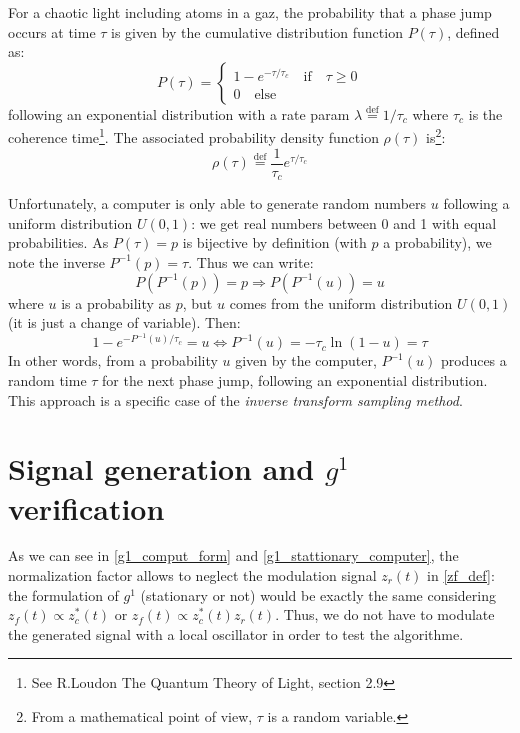 \documentclass[11pt]{report}
\begin{document}
For a chaotic light including atoms in a gaz, the probability that a phase jump occurs at time $\tau$ is given by the cumulative distribution function $P(\tau)$, defined as:
\begin{equation}
P(\tau) = \left\{
                \begin{array}{ll}
                1-e^{-\tau/\tau_c} \quad \textrm{if} \quad \tau \geqslant 0\\
                0 \quad \textrm{else}
                \end{array}
              \right.
\end{equation}
following an exponential distribution with a rate param $\lambda \stackrel{\text{def}}{=} 1 / \tau_c$ where $\tau_c$ is the coherence time\footnote{ See R.Loudon The Quantum Theory of Light, section 2.9}. The associated probability density function $\rho(\tau)$ is\footnote{From a mathematical point of view, $\tau$ is a random variable.}:
\begin{equation}
\rho(\tau) \stackrel{\text{def}}{=} \frac{1}{\tau_c} e^{\tau / \tau_c}
\end{equation}

Unfortunately, a computer is only able to generate random numbers $u$ following a uniform distribution $U(0,1)$: we get real numbers between 0 and 1 with equal probabilities. As $P(\tau) = p$ is bijective by definition (with $p$ a probability), we note the inverse $P^{-1}(p) = \tau$. Thus we can write:
\begin{equation}
P(P^{-1}(p)) = p \Rightarrow P(P^{-1}(u)) = u
\end{equation}
where $u$ is a probability as $p$, but $u$ comes from the uniform distribution $U(0,1)$ (it is just a change of variable). Then:
\begin{equation}
\label{dist_exp_gene}
1-e^{-P^{-1}(u)/\tau_c} = u \Leftrightarrow P^{-1}(u) = -\tau_c \ln(1-u) = \tau
\end{equation}
In other words, from a probability $u$ given by the computer, $P^{-1}(u)$ produces a random time $\tau$ for the next phase jump, following an exponential distribution. This approach is a specific case of the \textit{inverse transform sampling method}.

\section{Signal generation and $g^1$ verification}

As we can see in \eqref{g1_comput_form} and \eqref{g1_stattionary_computer}, the normalization factor allows to neglect the modulation signal $z_r(t)$ in \eqref{zf_def}: the formulation of $g^1$ (stationary or not) would be exactly the same considering $z_f(t) \propto z_c^*(t)$ or $z_f(t) \propto z_c^*(t)z_r(t)$. Thus, we do not have to modulate the generated signal with a local oscillator in order to test the algorithme.
\end{document}
